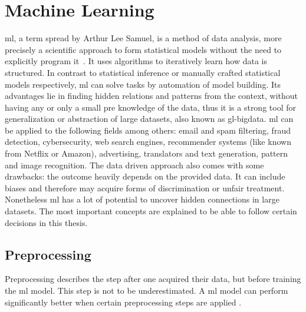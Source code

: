 


\section{Machine Learning}
\label{sec:machine-learning}

\gls{ml}, a term spread by Arthur Lee Samuel, is a method of data analysis, more precisely a scientific approach to form statistical models without the need to explicitly program it~\cite{mahesh2020machine}.
It uses algorithms to iteratively learn how data is structured.
In contrast to statistical inference or manually crafted statistical models respectively, \gls{ml} can solve tasks by automation of model building.
Its advantages lie in finding hidden relations and patterns from the context, without having any or only a small pre knowledge of the data, thus it is a strong tool for generalization or abstraction of large datasets, also known as \Gls{gl-bigdata}.
\gls{ml} can be applied to the following fields among others: email and spam filtering, fraud detection, cybersecurity, web search engines, recommender systems (like known from Netflix or Amazon), advertising, translators and text generation, pattern and image recognition.
The data driven approach also comes with some drawbacks: the outcome heavily depends on the provided data.
It can include biases and therefore may acquire forms of discrimination or unfair treatment.
Nonetheless \gls{ml} has a lot of potential to uncover hidden connections in large datasets.
The most important concepts are explained to be able to follow certain decisions in this thesis.


\subsection{Preprocessing}
\label{subsec:preprocessing}

Preprocessing describes the step after one acquired their data, but before training the \gls{ml} model.
This step is not to be underestimated.
A \gls{ml} model can perform significantly better when certain preprocessing steps are applied \cite{alam2019impact}.

